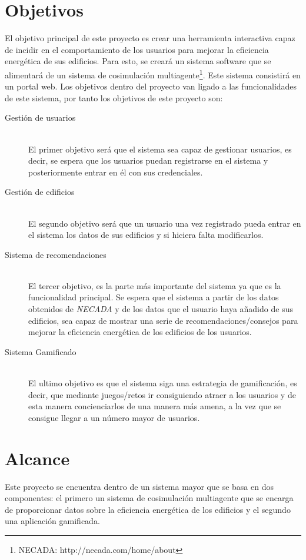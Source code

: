 \section{Objetivos}
El objetivo principal de este proyecto es crear una herramienta interactiva capaz de incidir en el comportamiento de los usuarios para mejorar la eficiencia energética de sus edificios.
Para esto,  se creará un sistema software que se alimentará de un sistema de cosimulación multiagente\footnote{NECADA: http://necada.com/home/about}. Este sistema consistirá en un portal web.
Los objetivos dentro del proyecto van ligado a las funcionalidades de este sistema, por tanto los objetivos de este proyecto son:
\begin{description}
\item[Gestión de usuarios] \hfill \\
El primer objetivo será que el sistema sea capaz de gestionar usuarios, es decir, se espera que los usuarios puedan registrarse en el sistema y posteriormente entrar en él con sus credenciales.
\item[Gestión de edificios]  \hfill \\
El segundo objetivo será que un usuario una vez registrado pueda entrar en el sistema los datos de sus edificios y si hiciera falta modificarlos.
\item[Sistema de recomendaciones] \hfill \\
El tercer objetivo, es la parte más importante del sistema ya que es la funcionalidad principal. Se espera que el sistema a partir de los datos obtenidos de \textit{NECADA} y de los datos que el usuario haya añadido de sus edificios, sea capaz de mostrar una serie de recomendaciones/consejos para mejorar la eficiencia energética de los edificios de los usuarios.
\item[Sistema Gamificado] \hfill \\
El ultimo objetivo es que el sistema siga una estrategia de gamificación, es decir, que mediante juegos/retos ir consiguiendo atraer a los usuarios y de esta manera concienciarlos de una manera más amena, a la vez que se consigue llegar a un número mayor de usuarios.
\end{description}
\clearpage
\section{Alcance}
Este proyecto se encuentra dentro de un sistema mayor que se basa en dos componentes: el primero un sistema de cosimulación multiagente que se encarga de proporcionar datos sobre la eficiencia energética de los edificios y el segundo una aplicación gamificada.

